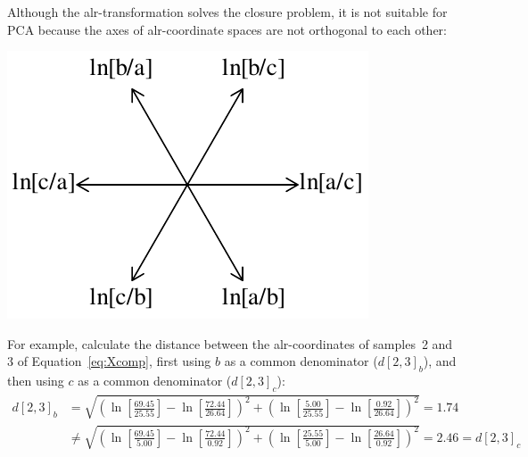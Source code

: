 Although the alr-transformation solves the closure problem, it is not
suitable for PCA because the axes of alr-coordinate spaces are not
orthogonal to each other:

\noindent\begin{minipage}[t][][b]{.3\textwidth}
\includegraphics[width=\textwidth]{../figures/alraxes.pdf}\medskip
\end{minipage}
\begin{minipage}[t][][t]{.7\textwidth}
  \label{fig:alraxes}
\end{minipage}

For example, calculate the distance between the alr-coordinates of
samples~2 and 3 of Equation~\ref{eq:Xcomp}, first using $b$ as a
common denominator ($d[2,3]_b$), and then using $c$ as a common
denominator ($d[2,3]_c$):
\begin{equation*}
  \begin{split}
    d[2,3]_b & =
    \sqrt{
      \left(
      \ln\!\left[\frac{69.45}{25.55}\right]-
      \ln\!\left[\frac{72.44}{26.64}\right]
      \right)^2 +
      \left(
      \ln\!\left[\frac{5.00}{25.55}\right]-
      \ln\!\left[\frac{0.92}{26.64}\right]
      \right)^2
    } = 1.74\\
    & \neq 
    \sqrt{
      \left(
      \ln\!\left[\frac{69.45}{5.00}\right]-
      \ln\!\left[\frac{72.44}{0.92}\right]
      \right)^2 +
      \left(
      \ln\!\left[\frac{25.55}{5.00}\right]-
      \ln\!\left[\frac{26.64}{0.92}\right]
      \right)^2
    } = 2.46 = d[2,3]_c
  \end{split}
\end{equation*}

